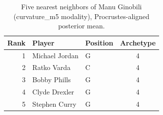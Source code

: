 \begin{table}[htbp]
  \centering\small
  \begin{tabular}{rllc}
    \toprule
    Rank & Player & Position & Archetype \\
    \midrule
    1 & Michael Jordan & G & 4 \\
    2 & Ratko Varda & C & 4 \\
    3 & Bobby Phills & G & 4 \\
    4 & Clyde Drexler & G & 4 \\
    5 & Stephen Curry & G & 4 \\
    \bottomrule
  \end{tabular}
  \caption{Five nearest neighbors of Manu Ginobili (curvature_m5 modality), Procrustes-aligned posterior mean.}
  \label{tab:Manu_Ginobili_neighbors_curvature_m5}
\end{table}

